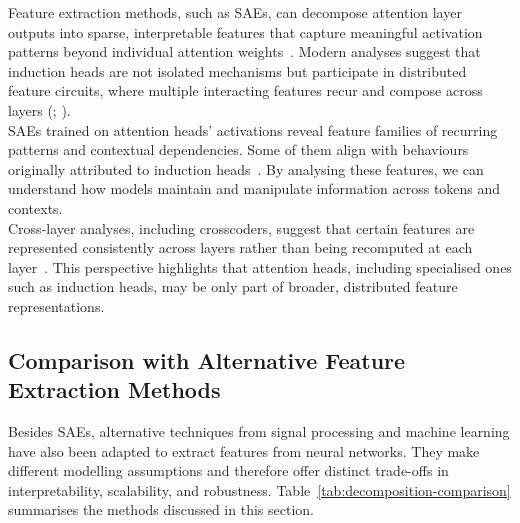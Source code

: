 \begin{examplebox}

Feature extraction methods, such as SAEs, can decompose attention layer outputs into sparse, interpretable features that capture meaningful activation patterns beyond individual attention weights~. Modern analyses suggest that induction heads are not isolated mechanisms but participate in distributed feature circuits, where multiple interacting features recur and compose across layers (; ).\\

SAEs trained on attention heads' activations reveal feature families of recurring patterns and contextual dependencies. Some of them align with behaviours originally attributed to induction heads~. By analysing these features, we can understand how models maintain and manipulate information across tokens and contexts.\\

Cross-layer analyses, including crosscoders, suggest that certain features are represented consistently across layers rather than being recomputed at each layer~. This perspective highlights that attention heads, including specialised ones such as induction heads, may be only part of broader, distributed feature representations.

\end{examplebox}

\subsection{Comparison with Alternative Feature Extraction Methods}

Besides SAEs, alternative techniques from signal processing and machine learning have also been adapted to extract features from neural networks. They make different modelling assumptions and therefore offer distinct trade-offs in interpretability, scalability, and robustness. Table~\ref{tab:decomposition-comparison} summarises the methods discussed in this section.

